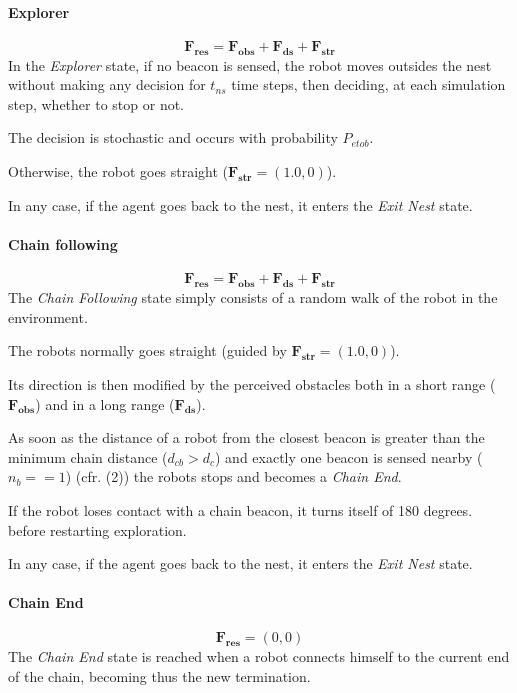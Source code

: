 \paragraph{Explorer}
\begin{equation}
  \mathbf{F_{res}} = \mathbf{F_{obs}} + \mathbf{F_{ds}} + \mathbf{F_{str}}
\end{equation}
In the \emph{Explorer} state, if no beacon is sensed, the robot moves outsides the nest without making any decision for $t_{ns}$ time steps, then deciding, at each simulation step, whether to stop or not.

The decision is stochastic and occurs with probability $P_{etob}$.

Otherwise, the robot goes straight ($\mathbf{F_{str}} = (1.0,0)$).

In any case, if the agent goes back to the nest, it enters the \emph{Exit Nest} state.

\paragraph{Chain following} \label{par:chainfollowing}
\begin{equation}
  \mathbf{F_{res}} = \mathbf{F_{obs}} + \mathbf{F_{ds}} + \mathbf{F_{str}}
\end{equation}
The \emph{Chain Following} state simply consists of a random walk of the robot 
in the environment.

The robots normally goes straight (guided by $\mathbf{F_{str}} = (1.0,0)$).

Its direction is then modified by the perceived obstacles both in a short range ($\mathbf{F_{obs}}$) and in a long range 
($\mathbf{F_{ds}}$).

As soon as the distance of a robot from the closest beacon is greater than the minimum chain distance ($d_{cb} > d_c$)
and exactly one beacon is sensed nearby ($n_b == 1$) (cfr.  (2)) 
the robots stops and becomes a \emph{Chain End}.

If the robot loses contact with a chain beacon, it turns itself of 180 degrees. before 
restarting exploration.

In any case, if the agent goes back to the nest, it enters the \emph{Exit Nest} state.


\paragraph{Chain End}
\begin{equation}
  \mathbf{F_{res}} = (0,0)
\end{equation}
The \emph{Chain End} state is reached when a robot connects himself to the current end of the chain, becoming thus the new termination.

